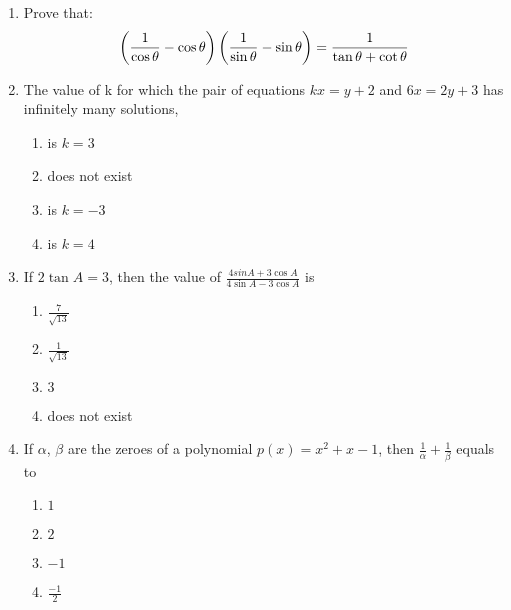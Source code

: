 \begin{enumerate}
\item Prove that:\\
\begin{align}
\left(\frac{1}{\cos\theta}-\cos\theta\right)\left(\frac{1}{\sin\theta}-\sin\theta\right) = \frac{1}{\tan\theta+\cot\theta}
\end{align}


\item The value of k for which the pair of equations $kx=y+2$ and $6x=2y+3$ has infinitely many solutions,
\begin{enumerate}
\item is $k=3$
\item does not exist
\item is $k=-3$
\item is $k=4$
\end{enumerate}


\item If $2\tan A=3$, then the value of $\frac{4sin A + 3\cos A}{4\sin A - 3\cos A}$ is
\begin{enumerate}
\item $\frac{7}{\sqrt{13}}$
\item $\frac{1}{\sqrt{13}}$
\item $3$
\item does not exist
\end{enumerate}


\item If $\alpha$, $\beta$ are the zeroes of a polynomial $p(x)=x^2+x-1$, then $\frac{1}{\alpha}+\frac{1}{\beta}$ equals to 
\begin{enumerate}
\item $1$
\item $2$
\item $-1$
\item $\frac{-1}{2}$
\end{enumerate}



\end{enumerate}
%

